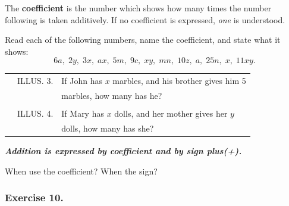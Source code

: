 \documentclass{book}
\begin{document}
The \textbf{ coefficient} is the number which shows how many times
the number following is taken additively. If no coefficient is
expressed, \textit{ one} is understood.

Read each of the following numbers, name the coefficient,
and state what it shows:
\[
6a,\; 2y,\; 3x,\; ax,\; 5m,\; 9c,\; xy,\; mn,\; 10z,\; a,\; 25n,\;
x,\; 11xy.
\]

\begin{tabular}{cll}
&ILLUS. 3. & If John has $x$ marbles, and his brother gives him
5\\
& & marbles, how many has he?\\
\\
&ILLUS. 4. &If Mary has $x$ dolls, and her mother gives her $y$\\
& &dolls, how many has she?\\
\end{tabular}

\textit{ \textbf{Addition is expressed by coefficient and by sign
plus(+).}}

When use the coefficient? When the sign?

\subsubsection*{Exercise 10.}
\end{document}

